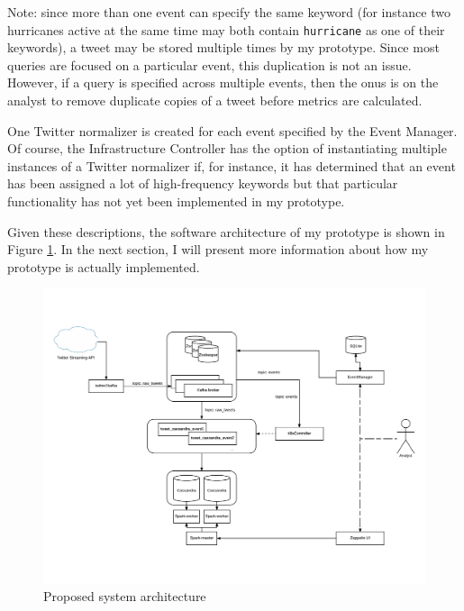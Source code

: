 \begin{itemize}
  Note: since more than one event can specify the same keyword (for instance two hurricanes active at the same time may both contain \texttt{hurricane} as one of their keywords), a tweet may be stored multiple times by my prototype. Since most queries are focused on a particular event, this duplication is not an issue. However, if a query is specified across multiple events, then the onus is on the analyst to remove duplicate copies of a tweet before metrics are calculated.

  One Twitter normalizer is created for each event specified by the Event Manager. Of course, the Infrastructure Controller has the option of instantiating multiple instances of a Twitter normalizer if, for instance, it has determined that an event has been assigned a lot of high-frequency keywords but that particular functionality has not yet been implemented in my prototype.
\end{itemize}

Given these descriptions, the software architecture of my prototype is shown in Figure \ref{fig:SysArch}. In the next section, I will present more information about how my prototype is actually implemented.

\begin{figure}
\centering
\includegraphics[width=\textwidth]{Figures/SysArch}
\decoRule
\caption[System architecture]{Proposed system architecture}
\label{fig:SysArch}
\end{figure}
